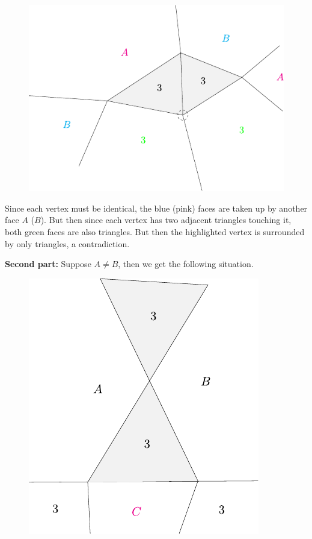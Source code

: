 \documentclass[twoside,10pt]{article}
\begin{document}
\begin{figure}[H]
	\centering
	\includegraphics[scale=1]{fig/23.pdf}
\end{figure}

Since each vertex must be identical, the blue (pink) faces are taken up by another face $A$ ($B$). But then since each vertex has two adjacent triangles touching it, both green faces are also triangles. But then the highlighted vertex is surrounded by only triangles, a contradiction.

\textbf{Second part:} Suppose $A \neq B$, then we get the following situation.

\begin{figure}[H]
	\centering
	\includegraphics[scale=1]{fig/23b.pdf}
\end{figure}
\end{document}
